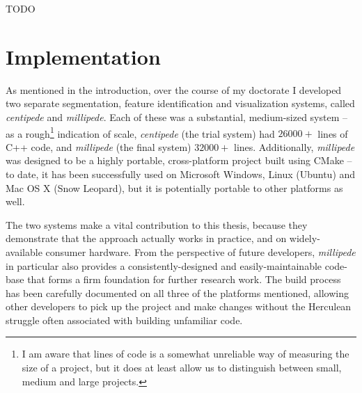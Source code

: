 TODO

\section{Implementation}

As mentioned in the introduction, over the course of my doctorate I developed two separate segmentation, feature identification and visualization systems, called \emph{centipede} and \emph{millipede}. Each of these was a substantial, medium-sized system -- as a rough\footnote{I am aware that lines of code is a somewhat unreliable way of measuring the size of a project, but it does at least allow us to distinguish between small, medium and large projects.} indication of scale, \emph{centipede} (the trial system) had $26000+$ lines of C++ code, and \emph{millipede} (the final system) $32000+$ lines. Additionally, \emph{millipede} was designed to be a highly portable, cross-platform project built using CMake -- to date, it has been successfully used on Microsoft Windows, Linux (Ubuntu) and Mac OS X (Snow Leopard), but it is potentially portable to other platforms as well.

The two systems make a vital contribution to this thesis, because they demonstrate that the approach actually works in practice, and on widely-available consumer hardware. From the perspective of future developers, \emph{millipede} in particular also provides a consistently-designed and easily-maintainable code-base that forms a firm foundation for further research work. The build process has been carefully documented on all three of the platforms mentioned, allowing other developers to pick up the project and make changes without the Herculean struggle often associated with building unfamiliar code.

